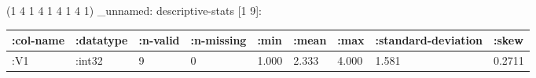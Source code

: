 \documentclass[]{article}
\begin{document}
(1 4 1 4 1 4 1 4 1) \_unnamed: descriptive-stats {[}1 9{]}:

\begin{longtable}[]{@{}lllllllll@{}}
\toprule
\begin{minipage}[b]{0.09\columnwidth}\raggedright\strut
:col-name\strut
\end{minipage} & \begin{minipage}[b]{0.09\columnwidth}\raggedright\strut
:datatype\strut
\end{minipage} & \begin{minipage}[b]{0.08\columnwidth}\raggedright\strut
:n-valid\strut
\end{minipage} & \begin{minipage}[b]{0.10\columnwidth}\raggedright\strut
:n-missing\strut
\end{minipage} & \begin{minipage}[b]{0.06\columnwidth}\raggedright\strut
:min\strut
\end{minipage} & \begin{minipage}[b]{0.06\columnwidth}\raggedright\strut
:mean\strut
\end{minipage} & \begin{minipage}[b]{0.06\columnwidth}\raggedright\strut
:max\strut
\end{minipage} & \begin{minipage}[b]{0.16\columnwidth}\raggedright\strut
:standard-deviation\strut
\end{minipage} & \begin{minipage}[b]{0.07\columnwidth}\raggedright\strut
:skew\strut
\end{minipage}\tabularnewline
\midrule
\endhead
\begin{minipage}[t]{0.09\columnwidth}\raggedright\strut
:V1\strut
\end{minipage} & \begin{minipage}[t]{0.09\columnwidth}\raggedright\strut
:int32\strut
\end{minipage} & \begin{minipage}[t]{0.08\columnwidth}\raggedright\strut
9\strut
\end{minipage} & \begin{minipage}[t]{0.10\columnwidth}\raggedright\strut
0\strut
\end{minipage} & \begin{minipage}[t]{0.06\columnwidth}\raggedright\strut
1.000\strut
\end{minipage} & \begin{minipage}[t]{0.06\columnwidth}\raggedright\strut
2.333\strut
\end{minipage} & \begin{minipage}[t]{0.06\columnwidth}\raggedright\strut
4.000\strut
\end{minipage} & \begin{minipage}[t]{0.16\columnwidth}\raggedright\strut
1.581\strut
\end{minipage} & \begin{minipage}[t]{0.07\columnwidth}\raggedright\strut
0.2711\strut
\end{minipage}\tabularnewline
\bottomrule
\end{longtable}
\end{document}
